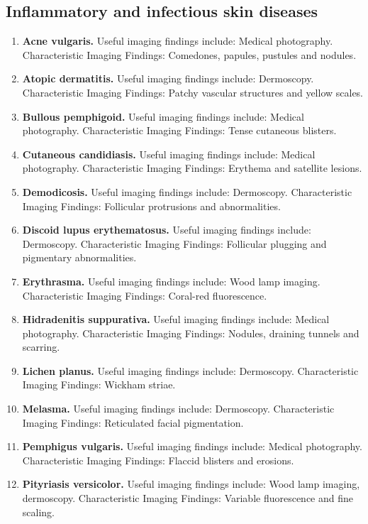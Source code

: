 \subsection{Inflammatory and infectious skin diseases}
\begin{enumerate}[leftmargin=*,itemsep=0.45em,topsep=0.4em]
\item \textbf{Acne vulgaris.} Useful imaging findings include: Medical photography. Characteristic Imaging Findings: Comedones, papules, pustules and nodules.
\item \textbf{Atopic dermatitis.} Useful imaging findings include: Dermoscopy. Characteristic Imaging Findings: Patchy vascular structures and yellow scales.
\item \textbf{Bullous pemphigoid.} Useful imaging findings include: Medical photography. Characteristic Imaging Findings: Tense cutaneous blisters.
\item \textbf{Cutaneous candidiasis.} Useful imaging findings include: Medical photography. Characteristic Imaging Findings: Erythema and satellite lesions.
\item \textbf{Demodicosis.} Useful imaging findings include: Dermoscopy. Characteristic Imaging Findings: Follicular protrusions and abnormalities.
\item \textbf{Discoid lupus erythematosus.} Useful imaging findings include: Dermoscopy. Characteristic Imaging Findings: Follicular plugging and pigmentary abnormalities.
\item \textbf{Erythrasma.} Useful imaging findings include: Wood lamp imaging. Characteristic Imaging Findings: Coral-red fluorescence.
\item \textbf{Hidradenitis suppurativa.} Useful imaging findings include: Medical photography. Characteristic Imaging Findings: Nodules, draining tunnels and scarring.
\item \textbf{Lichen planus.} Useful imaging findings include: Dermoscopy. Characteristic Imaging Findings: Wickham striae.
\item \textbf{Melasma.} Useful imaging findings include: Dermoscopy. Characteristic Imaging Findings: Reticulated facial pigmentation.
\item \textbf{Pemphigus vulgaris.} Useful imaging findings include: Medical photography. Characteristic Imaging Findings: Flaccid blisters and erosions.
\item \textbf{Pityriasis versicolor.} Useful imaging findings include: Wood lamp imaging, dermoscopy. Characteristic Imaging Findings: Variable fluorescence and fine scaling.

\end{enumerate}
